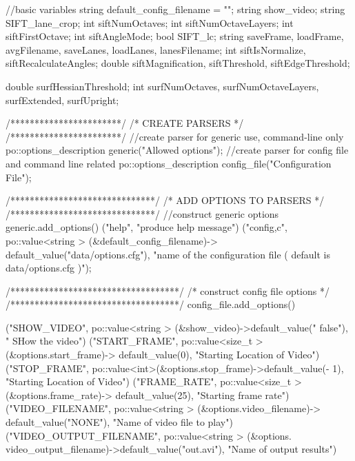 \begin{DoxyCode}
                                                                               
                     {


    //basic variables
    string default_config_filename = "";
    string show_video;
    string SIFT_lane_crop;
    int siftNumOctaves;
    int siftNumOctaveLayers;
    int siftFirstOctave;
    int siftAngleMode;
    bool SIFT_lc;
    string saveFrame, loadFrame, avgFilename, saveLanes, loadLanes, 
      lanesFilename;
    int siftIsNormalize, siftRecalculateAngles;
    double siftMagnification, siftThreshold, siftEdgeThreshold;

    double surfHessianThreshold;
    int surfNumOctaves, surfNumOctaveLayers, surfExtended, surfUpright;


    /***********************/
    /* CREATE PARSERS */
    /***********************/
    //create parser for generic use, command-line only
    po::options_description generic("Allowed options");
    //create parser for config file and command line related
    po::options_description config_file("Configuration File");

    /******************************/
    /* ADD OPTIONS TO PARSERS     */
    /******************************/
    //construct generic options
    generic.add_options()
            ("help", "produce help message")
            ("config,c", po::value<string > (&default_config_filename)->
      default_value("data/options.cfg"),
            "name of the configuration file ( default is data/options.cfg )");

    /***********************************/
    /* construct config file options   */
    /***********************************/
    config_file.add_options()

            ("SHOW_VIDEO", po::value<string > (&show_video)->default_value("
      false"), " SHow the video")
            ("START_FRAME", po::value<size_t > (&options.start_frame)->
      default_value(0), "Starting Location of Video")
            ("STOP_FRAME", po::value<int>(&options.stop_frame)->default_value(-
      1), "Starting Location of Video")
            ("FRAME_RATE", po::value<size_t > (&options.frame_rate)->
      default_value(25), "Starting frame rate")
            ("VIDEO_FILENAME", po::value<string > (&options.video_filename)->
      default_value("NONE"), "Name of video file to play")
            ("VIDEO_OUTPUT_FILENAME", po::value<string > (&options.
      video_output_filename)->default_value("out.avi"), "Name of output results")

}
\end{DoxyCode}
